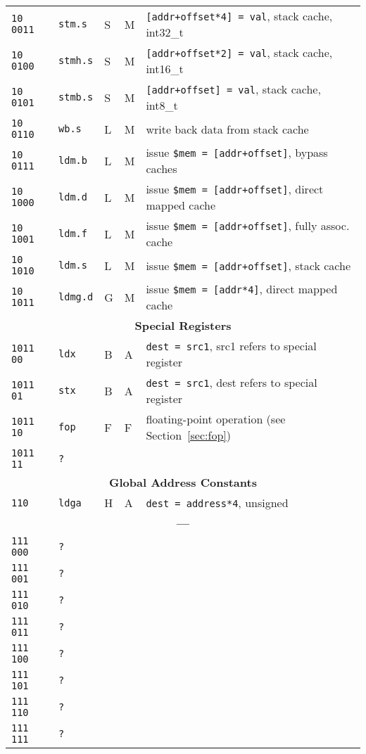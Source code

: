 \documentclass[10pt,DIV12]{scrartcl}
\begin{document}
\begin{longtable}{llllp{}}
\texttt{10 0011} & \texttt{stm.s} & S & M & \texttt{[addr+offset*4] = val}, stack cache, int32\_t \\
\texttt{10 0100} & \texttt{stmh.s} & S & M & \texttt{[addr+offset*2] = val}, stack cache, int16\_t \\
\texttt{10 0101} & \texttt{stmb.s} & S & M & \texttt{[addr+offset] = val}, stack cache, int8\_t \\
\texttt{10 0110} & \texttt{wb.s} & L & M & write back data from stack cache \\
\texttt{10 0111} & \texttt{ldm.b} & L & M & issue \texttt{\$mem = [addr+offset]}, bypass caches \\
\texttt{10 1000} & \texttt{ldm.d} & L & M & issue \texttt{\$mem = [addr+offset]}, direct mapped cache \\
\texttt{10 1001} & \texttt{ldm.f} & L & M & issue \texttt{\$mem = [addr+offset]}, fully assoc. cache \\
\texttt{10 1010} & \texttt{ldm.s} & L & M & issue \texttt{\$mem = [addr+offset]}, stack cache \\
\texttt{10 1011} & \texttt{ldmg.d} & G & M & issue \texttt{\$mem = [addr*4]}, direct mapped cache\\
\midrule
\multicolumn{5}{c}{\textsf{\textbf{Special Registers}}} \\
\cmidrule{1-5}
\texttt{1011 00} & \texttt{ldx} & B & A & \texttt{dest = src1}, src1 refers to special register \\
\texttt{1011 01} & \texttt{stx} & B & A & \texttt{dest = src1}, dest refers to special register \\
\texttt{1011 10} & \texttt{fop} & F & F & floating-point operation (see Section~\ref{sec:fop}) \\
\texttt{1011 11} & \texttt{?} & & & \\
\midrule
\multicolumn{5}{c}{\textsf{\textbf{Global Address Constants}}} \\
\cmidrule{1-5}
\texttt{110} & \texttt{ldga} & H & A & \texttt{dest = address*4}, unsigned \\
\midrule
\multicolumn{5}{c}{\textbf{---}} \\
\cmidrule{1-5}
\texttt{111 000} & \texttt{?} & & & \\
\texttt{111 001} & \texttt{?} & & & \\
\texttt{111 010} & \texttt{?} & & & \\
\texttt{111 011} & \texttt{?} & & & \\
\texttt{111 100} & \texttt{?} & & & \\
\texttt{111 101} & \texttt{?} & & & \\
\texttt{111 110} & \texttt{?} & & & \\
\texttt{111 111} & \texttt{?} & & & \\
\bottomrule
\end{longtable}  
\end{document}
